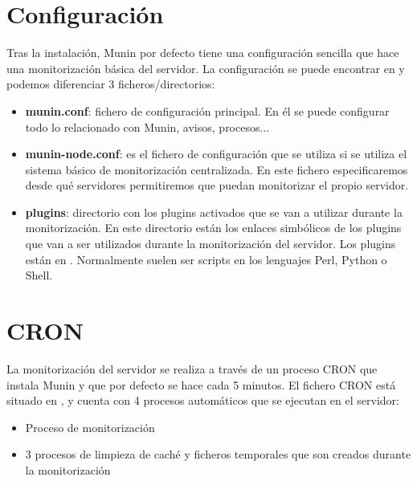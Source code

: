 \section{Configuración}

Tras la instalación, Munin por defecto tiene una configuración sencilla que hace una monitorización básica del servidor. La configuración se puede encontrar en     y podemos diferenciar 3 ficheros/directorios:

\begin{itemize}
    \item \textbf{munin.conf}: fichero de configuración principal. En él se puede configurar todo lo relacionado con Munin, avisos, procesos...
    \item \textbf{munin-node.conf}: es el fichero de configuración que se utiliza si se utiliza el sistema básico de monitorización centralizada. En este fichero especificaremos desde qué servidores permitiremos que puedan monitorizar el propio servidor.
    \item \textbf{plugins}: directorio con los plugins activados que se van a utilizar durante la monitorización. En este directorio están los enlaces simbólicos de los plugins que van a ser utilizados durante la monitorización del servidor. Los plugins están en    . Normalmente suelen ser scripts en los lenguajes Perl, Python o Shell.
\end{itemize}

\section{CRON}

La monitorización del servidor se realiza a través de un proceso CRON que instala Munin y que por defecto se hace cada 5 minutos. El fichero CRON está situado en , y cuenta con 4 procesos automáticos que se ejecutan en el servidor:

\begin{itemize}
    \item Proceso de monitorización
    \item 3 procesos de limpieza de caché y ficheros temporales que son creados durante la monitorización
\end{itemize}


\clearpage
